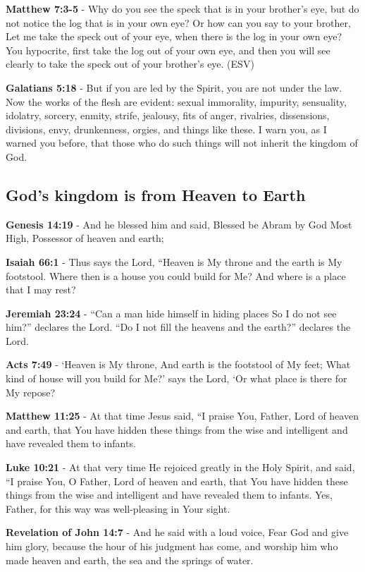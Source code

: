 \documentclass[11pt]{article}
\begin{document}
\textbf{Matthew 7:3-5} - Why do you see the speck that is in your brother's eye, but do not notice the log that is in your own eye? Or how can you say to your brother, Let me take the speck out of your eye, when there is the log in your own eye? You hypocrite, first take the log out of your own eye, and then you will see clearly to take the speck out of your brother's eye. (ESV)

\textbf{Galatians 5:18} - But if you are led by the Spirit, you are not under the law. Now the works of the flesh are evident: sexual immorality, impurity, sensuality, idolatry, sorcery, enmity, strife, jealousy, fits of anger, rivalries, dissensions, divisions, envy, drunkenness, orgies, and things like these. I warn you, as I warned you before, that those who do such things will not inherit the kingdom of God.

\subsection{God's kingdom is from Heaven to Earth}
\label{sec:org891a204}
\textbf{Genesis 14:19} - And he blessed him and said, Blessed be Abram by God Most High, Possessor of heaven and earth;

\textbf{Isaiah 66:1} - Thus says the Lord, “Heaven is My throne and the earth is My footstool. Where then is a house you could build for Me? And where is a place that I may rest?􀀂􀁓

\textbf{Jeremiah 23:24} - “Can a man hide himself in hiding places So I do not see him?” declares the Lord. “Do I not fill the heavens and the earth?” declares the Lord.􀀂􁨬

\textbf{Acts 7:49} - ‘Heaven is My throne, And earth is the footstool of My feet; What kind of house will you build for Me?’ says the Lord, ‘Or what place is there for My repose?􀀂􌸘

\textbf{Matthew 11:25} - At that time Jesus said, “I praise You, Father, Lord of heaven and earth, that You have hidden these things from the wise and intelligent and have revealed them to infants.

\textbf{Luke 10:21} - At that very time He rejoiced greatly in the Holy Spirit, and said, “I praise You, O Father, Lord of heaven and earth, that You have hidden these things from the wise and intelligent and have revealed them to infants. Yes, Father, for this way was well-pleasing in Your sight.

\textbf{Revelation of John 14:7} - And he said with a loud voice, Fear God and give him glory, because the hour of his judgment has come, and worship him who made heaven and earth, the sea and the springs of water.
\end{document}
